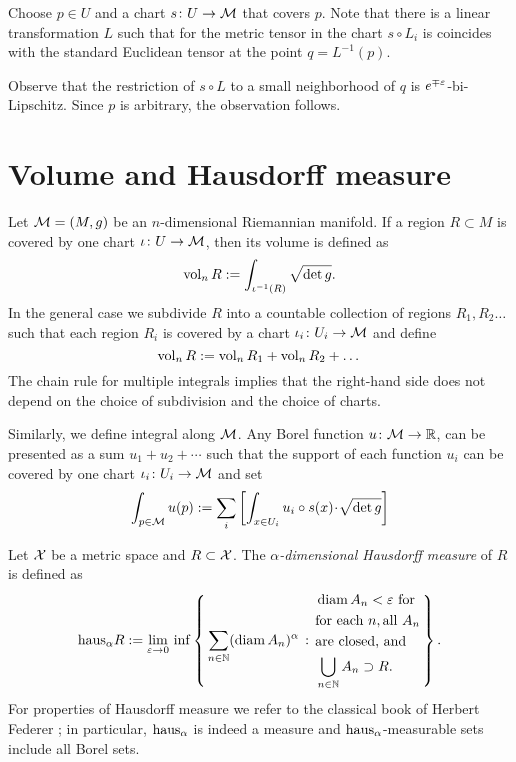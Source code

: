 Choose $p\in U$ and a chart $s\colon U\to \mathcal{M}$ that covers $p$.
Note that there is a linear transformation $L$ such that for the metric tensor in the chart $s\circ L_i$ is coincides with the standard Euclidean tensor at the point $q=L^{-1}(p)$.

Observe that the restriction of $s\circ L$ to a small neighborhood of $q$ is $e^{\mp\varepsilon}$-bi-Lipschitz.
Since $p$ is arbitrary, the observation follows.
\qeds

\section{Volume and Hausdorff measure}

Let $\mathcal{M}=(M,g)$ be an $n$-dimensional Riemannian manifold.
If a region $R\subset M$ is covered by one chart $\iota\colon U\to \mathcal{M}$,
then its volume is defined as 
\[\operatorname{\rm vol}\nolimits_n R
\mathrel{:=}
\int_{\iota^{-1}(R)}\sqrt{\det{g}}.\]
In the general case we subdivide $R$ into a countable collection of regions $R_1,R_2\dots$ such that each region $R_i$ is covered by a chart $\iota_i\colon U_i\to \mathcal{M}$ and define
\[\operatorname{\rm vol}\nolimits_n R\mathrel{:=} \operatorname{\rm vol}\nolimits_n R_1+\operatorname{\rm vol}\nolimits_n R_2+\dots\]
The chain rule for multiple integrals implies that the right-hand side does not depend on the choice of subdivision and the choice of charts.

Similarly, we define integral along $\mathcal{M}$.
Any Borel function $u\colon\mathcal{M}\to \mathbb{R}$, can be presented as a sum $u_1+u_2+\cdots$ such that the support of each function $u_i$ can be covered by one chart $\iota_i\colon U_i\to \mathcal{M}$
and set 
\[\int_{p\in\spc{M}} u(p)
\df
\sum_i\left[\int_{x\in U_i} u_i\circ s(x)\cdot\sqrt{\det{g}}\right]
\]

Let $\mathcal{X}$ be a metric space and $R\subset \mathcal{X}$.
The \emph{$\alpha$-dimensional Hausdorff measure} of $R$ is defined as 
$$\mathrm{haus}_\alpha R
\mathrel{:=}
\lim_{\varepsilon\to0}
\,
\inf
\left\{\,{\sum_{n\in\mathbb{N}}(\operatorname{\rm diam}\nolimits A_n)^\alpha}\,:\,{\begin{aligned}
&\operatorname{\rm diam}\nolimits A_n<\varepsilon\ \text{for}
\\
&\text{for each}\ n,\text{all}\  A_n
\\
&\text{are closed, and} 
\\
& \bigcup_{n\in\mathbb{N}}A_n\supset R.
\end{aligned}
}\,\right\}.$$
For properties of Hausdorff measure we refer to the classical book of  Herbert Federer \cite{federer};
in particular, $\mathrm{haus}_\alpha$ is indeed a measure and $\mathrm{haus}_\alpha$-measurable sets include all Borel sets.

